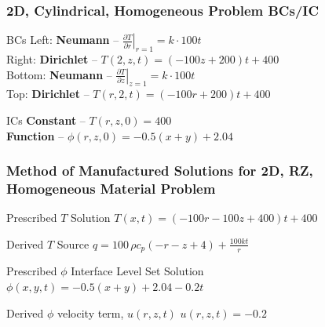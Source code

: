 \documentclass[]{beamer}
\begin{document}
\begin{frame}[t]\frametitle{2D, Cylindrical, Homogeneous Problem BCs/IC}
  \begin{block}{BCs}
    Left: \textbf{Neumann} -- $\left. \frac{\partial T}{\partial r}\right|_{r=1} = k\cdot 100t$ \\
    Right: \textbf{Dirichlet} -- $T(2,z,t) = (-100z + 200)t +400$ \\
    Bottom: \textbf{Neumann} -- $\left. \frac{\partial T}{\partial z}\right|_{z=1} = k\cdot 100t$ \\
    Top: \textbf{Dirichlet} -- $T(r,2,t) = (-100r + 200)t + 400$
  \end{block}
  
  \begin{block}{ICs}
    \textbf{Constant} -- $T(r,z,0) = 400$ \\
    \textbf{Function} -- $\phi(r,z,0) = -0.5(x+y) + 2.04$
  \end{block}
\end{frame}

\begin{frame}[t]\frametitle{Method of Manufactured Solutions for 2D, RZ, Homogeneous Material Problem}
  \begin{block}{Prescribed $T$ Solution}
    $T(x,t) = (-100r-100z+400)t + 400$
  \end{block}
  
  \begin{block}{Derived $T$ Source}
  $q = 100\,\rho c_p \left(-r-z+4\right)+\frac{100kt}{r}$
  \end{block}
  
  \begin{block}{Prescribed $\phi$ Interface Level Set Solution}
    $\phi(x,y,t) = -0.5(x+y) + 2.04 - 0.2t$
  \end{block}
  
  \begin{block}{Derived $\phi$ velocity term, $u(r,z,t)$}
    $u(r,z,t) = -0.2$
  \end{block}
\end{frame}

\end{document}
